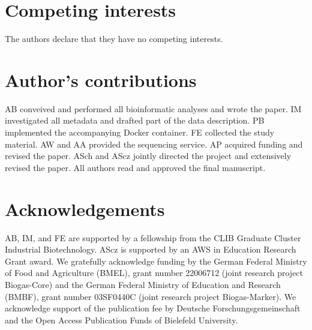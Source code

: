 \documentclass{bmcart}
\begin{document}
\begin{backmatter}

\section*{Competing interests}
The authors declare that they have no competing interests.

\section*{Author's contributions}
AB conveived and performed all bioinformatic analyses and wrote the paper.
IM investigated all metadata and drafted part of the data description.
PB implemented the accompanying Docker container.
FE collected the study material.
AW and AA provided the sequencing service.
AP acquired funding and revised the paper.
ASch and AScz jointly directed the project and extensively revised the paper.
All authors read and approved the final manuscript.

\section*{Acknowledgements}
AB, IM, and FE are supported by a fellowship from the CLIB Graduate Cluster Industrial Biotechnology.
AScz is supported by an AWS in Education Research Grant award.
We gratefully acknowledge funding by the German Federal Ministry of Food and Agriculture (BMEL), grant number 22006712 (joint research project Biogas-Core) and the German Federal Ministry of Education and Research (BMBF), grant number 03SF0440C (joint research project Biogas-Marker).
We acknowledge support of the publication fee by Deutsche Forschungsgemeinschaft and the Open Access Publication Funds of Bielefeld University.



\end{backmatter}
\end{document}
